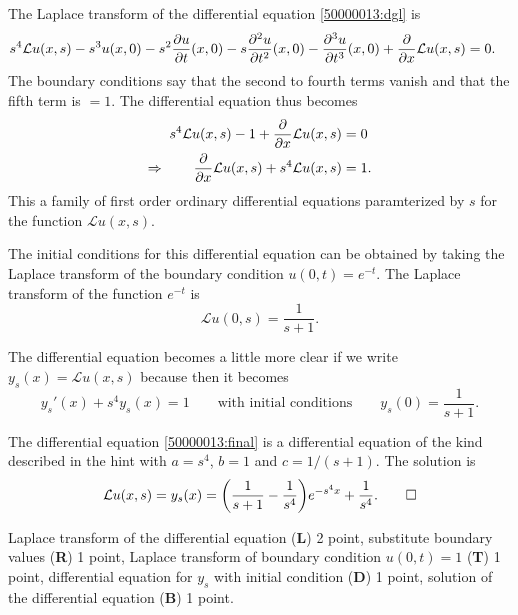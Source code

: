 \begin{loesung}
\begin{teilaufgaben}
\item
The Laplace transform of the differential equation
\eqref{50000013:dgl}
is
\begin{align*}
s^4 {\cal L}u(x,s)
-s^3 u(x,0)
-s^2\frac{\partial u}{\partial t}(x,0)
-s\frac{\partial^2 u}{\partial t^2}(x,0)
-\frac{\partial^3 u}{\partial t^3}(x,0)
+
\frac{\partial}{\partial x}{\cal L}u(x,s)
&=
0.
\end{align*}
The boundary conditions say that the second to fourth terms vanish
and that the fifth term is $=1$.
The differential equation thus becomes
\begin{align*}
s^4 {\cal L}u(x,s)
-1
+
\frac{\partial}{\partial x}{\cal L}u(x,s)
&=
0
\\
\Rightarrow\qquad
\frac{\partial}{\partial x}{\cal L}u(x,s)
+
s^4 {\cal L}u(x,s)
&=
1.
\end{align*}
This a family of first order ordinary differential equations
paramterized by $s$ for the function $\mathscr{L}u(x,s)$.

The initial conditions for this differential equation can be obtained
by taking the Laplace transform of the boundary condition
$u(0,t)=e^{-t}$.
The Laplace transform of the function $e^{-t}$ is
\[
\mathscr{L}u(0,s) = \frac1{s+1}.
\]

The differential equation becomes a little more clear if we write
$y_s(x) = \mathscr{L}u(x,s)$ because then it becomes
\begin{equation}
y_s'(x) + s^4 y_s(x)=1
\qquad\text{with initial conditions}\qquad
y_s(0)=\frac1{s+1}.
\label{50000013:final}
\end{equation}

\item
The differential equation \eqref{50000013:final} is a differential equation
of the kind described in the hint with $a=s^4$, $b=1$ and $c=1/(s+1)$.
The solution is
\[
{\cal L}u(x,s)
=
y_s(x)
=
\biggl(\frac1{s+1}-\frac1{s^4}\biggr)e^{-s^4x} + \frac{1}{s^4}.
\qedhere
\]
\end{teilaufgaben}
\end{loesung}

\begin{bewertung}
Laplace transform  of the differential equation ({\bf L}) 2 point,
substitute boundary values ({\bf R}) 1 point,
Laplace transform of boundary condition $u(0,t)=1$ ({\bf T}) 1 point,
differential equation for $y_s$ with initial condition ({\bf D}) 1 point,
solution of the differential equation ({\bf B}) 1 point.
\end{bewertung}
